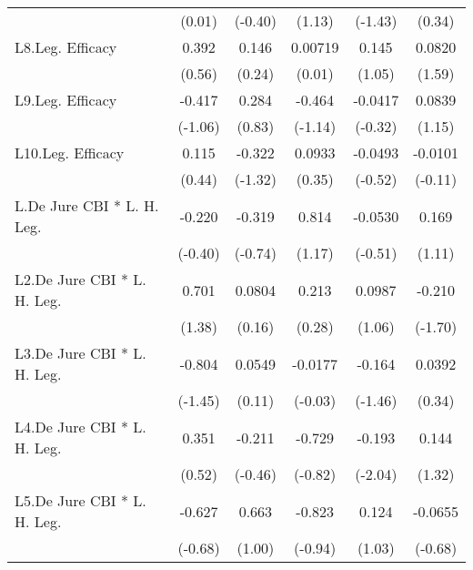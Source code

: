 {\begin{longtable}{l*{5}{c}}
                &   (0.01)         &  (-0.40)         &   (1.13)         &  (-1.43)         &   (0.34)         \\
[1em]
L8.Leg. Efficacy&    0.392         &    0.146         &  0.00719         &    0.145         &   0.0820         \\
                &   (0.56)         &   (0.24)         &   (0.01)         &   (1.05)         &   (1.59)         \\
[1em]
L9.Leg. Efficacy&   -0.417         &    0.284         &   -0.464         &  -0.0417         &   0.0839         \\
                &  (-1.06)         &   (0.83)         &  (-1.14)         &  (-0.32)         &   (1.15)         \\
[1em]
L10.Leg. Efficacy&    0.115         &   -0.322         &   0.0933         &  -0.0493         &  -0.0101         \\
                &   (0.44)         &  (-1.32)         &   (0.35)         &  (-0.52)         &  (-0.11)         \\
[1em]
L.De Jure CBI * L. H. Leg.&   -0.220         &   -0.319         &    0.814         &  -0.0530         &    0.169         \\
                &  (-0.40)         &  (-0.74)         &   (1.17)         &  (-0.51)         &   (1.11)         \\
[1em]
L2.De Jure CBI * L. H. Leg.&    0.701         &   0.0804         &    0.213         &   0.0987         &   -0.210         \\
                &   (1.38)         &   (0.16)         &   (0.28)         &   (1.06)         &  (-1.70)         \\
[1em]
L3.De Jure CBI * L. H. Leg.&   -0.804         &   0.0549         &  -0.0177         &   -0.164         &   0.0392         \\
                &  (-1.45)         &   (0.11)         &  (-0.03)         &  (-1.46)         &   (0.34)         \\
[1em]
L4.De Jure CBI * L. H. Leg.&    0.351         &   -0.211         &   -0.729         &   -0.193\sym{*}  &    0.144         \\
                &   (0.52)         &  (-0.46)         &  (-0.82)         &  (-2.04)         &   (1.32)         \\
[1em]
L5.De Jure CBI * L. H. Leg.&   -0.627         &    0.663         &   -0.823         &    0.124         &  -0.0655         \\
                &  (-0.68)         &   (1.00)         &  (-0.94)         &   (1.03)         &  (-0.68)         \\

\end{longtable}}
